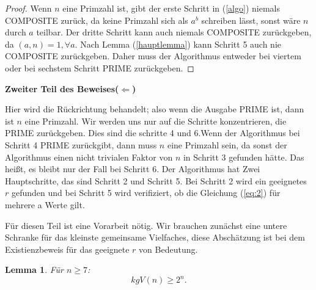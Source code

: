 \documentclass[12pt,oneside]{article}
\newtheorem{lemma}[theorem]{Lemma}
\theoremstyle{remark}
\theoremstyle{definition}
\begin{document}
\begin{proof}
Wenn $n$ eine Primzahl ist, gibt der erste Schritt in (\ref{algo}) niemals COMPOSITE zurück, da keine Primzahl sich als $a^b$ schreiben lässt, sonst wäre $n$ durch $a$ teilbar. Der dritte Schritt kann auch niemals COMPOSITE zurückgeben, da $(a,n) = 1, \forall a$. Nach Lemma (\ref{hauptlemma}) kann Schritt 5 auch nie COMPOSITE zurückgeben. Daher muss der Algorithmus entweder bei viertem oder bei sechstem Schritt PRIME zurückgeben.  
\end{proof}

\textbf{Zweiter Teil des Beweises($\Leftarrow$)}

Hier wird die Rückrichtung behandelt; also  wenn die Ausgabe PRIME ist, dann ist $n$ eine Primzahl. Wir werden uns nur auf die Schritte konzentrieren, die PRIME zurückgeben. Dies sind die schritte 4 und 6.\newline\newline Wenn der Algorithmus bei Schritt 4 PRIME zurückgibt, dann muss $n$ eine Primzahl sein, da sonst der Algorithmus einen nicht trivialen Faktor von $n$ in Schritt 3 gefunden hätte. Das heißt, es bleibt nur der Fall bei Schritt 6. Der Algorithmus hat Zwei Hauptschritte, das sind Schritt 2 und Schritt 5. Bei Schritt 2 wird ein geeignetes $r$ gefunden und bei Schritt 5 wird verifiziert, ob die Gleichung (\ref{eq:2}) für mehrere a Werte gilt.    

Für diesen Teil ist eine Vorarbeit nötig. Wir brauchen zunächst eine untere Schranke für das kleinste gemeinsame Vielfaches, diese Abschätzung ist bei dem Existienzbeweis für das geeignete $r$ von Bedeutung.


\begin{lemma}\label{lemma_1}
Für $n \geq 7$:\newline
\begin{equation}
    kgV(n) \geq 2^n.  
\end{equation}
\end{lemma}
\end{document}
